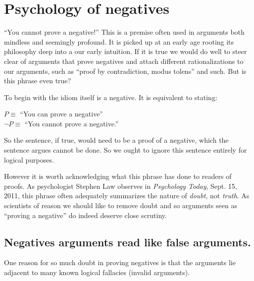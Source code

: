 \documentclass{amsart}
\begin{document}
\section{Psychology of negatives}
``You cannot prove a negative!'' This is a premise often used in arguments both
mindless and seemingly profound.  It is picked up at an early age rooting its
philosophy deep into a our early intuition.  
If it is true we would do well to steer clear of arguments 
that prove negatives and attach different rationalizations to our 
arguments, such as ``proof by contradiction, modus tolens'' and such.
But is this phrase even true?

To begin with the idiom itself is a negative.  It is equivalent to stating:
\begin{center}
    $P\equiv$ ``You can prove a negative''\\
    $\neg P\equiv$ ``You cannot prove a negative.''
\end{center}
So the sentence, if true, would need to be a proof of a
negative, which the sentence argues cannot be done.  So we ought to 
ignore this sentence entirely for logical purposes.

However it is worth acknowledging what this phrase has done 
to readers of proofs.
As psychologist Stephen Law observes in \emph{Psychology Today}, Sept. 15, 2011,
this phrase often adequately summarizes the nature of \emph{doubt}, 
not \emph{truth}.  
As scientists of reason we should like to remove doubt 
and so arguments seen as ``proving a negative'' do indeed deserve 
close scrutiny.

\subsection*{Negatives arguments read like false arguments.}
One reason for so much doubt in proving negatives is that the arguments lie
adjacent to many known logical fallacies (invalid arguments).  
\end{document}

